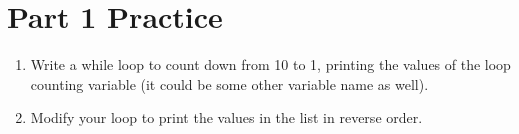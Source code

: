 \documentclass[letterpaper,10pt,english]{sphinxmanual}
\begin{document}
\section{Part 1 Practice}
\label{\detokenize{lecture_notes/lec09_loops1_while:part-1-practice}}\begin{enumerate}
\def\theenumi{\arabic{enumi}}
\def\labelenumi{\theenumi .}
\makeatletter\def\p@enumii{\p@enumi \theenumi .}\makeatother
\item {} 
Write a while loop to count down from 10 to 1, printing the values
of the loop counting variable  (it could be some other variable
name as well).

\item {} 
Modify your loop to print the values in the list  in
reverse order.

\end{enumerate}
\end{document}
